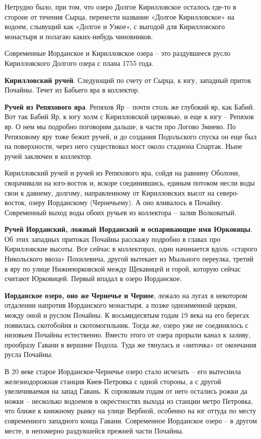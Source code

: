 Нетрудно было, при том, что озеро Долгое Кирилловское осталось где-то в стороне от течения Сырца, перенести название «Долгое Кирилловское» на водоем, слывущий как «Долгое и Узкое», с выгодой для Кирилловского монастыря и полагаю каких-нибудь чиновников.

Современные Иорданское и Кирилловское озера – это раздувшееся русло Кирилловского Долгого озера с плана 1755 года.

\textbf{Кирилловский ручей}. Следующий по счету от Сырца, к югу, западный приток Почайны. Течет из Бабьего яра в коллектор. 

\textbf{Ручей из Репяхового яра}. Репяхов Яр – почти столь же глубокий яр, как Бабий. Вот так Бабий Яр, к югу холм с Кирилловской церковью, и еще к югу – Репяхов яр. О нем мы подробно поговорим дальше, в части про Логово Змиево. По Репяховому яру тоже бежит ручей, и до создания Подольского спуска он еще был на поверхности, через него существовал мост около стадиона Спартак. Ныне ручей заключен в коллектор.

Кирилловский ручей и ручей из Репяхового яра, сойдя на равнину Оболони, сворачивали на юго-восток и, вскоре соединившись, единым потоком несли воды свои к давнему, долгому, направленному от Кирилловских высот на северо-восток, озеру Иорданскому (Чернечьему). А оно вливалось в Почайну. Современный выход воды обоих ручьев из коллектора – залив Волковатый.
 
\textbf{Ручей Иорданский, ложный Иорданский и оспаривающие имя Юрковицы}. Об этих западных притоках Почайны расскажу подробно в главах про Кирилловские высоты. Все сейчас в коллекторах, один начинается вдоль «старого Никольского ввоза» Похилевича, другой вытекает из Мыльного переулка, третий в яру по улице Нижнеюрковской между Щекавицей и горой, которую сейчас считают Юрковицей. Первый впадал в озеро Иорданское.

\textbf{Иорданское озеро, оно же Чернечье и Черное}, лежало на лугах в некотором отдалении напротив Иорданского монастыря, а позже одноименной церкви, между оной и руслом Почайны. К восьмидесятым годам 19 века на его берегах появилась скотобойня и скотомогильник. Тогда же, озеро уже не соединялось с низовьем Почайны естественно. Вместо этого от озера прорыли канал к заливу, прообразу Гавани в вершине Подола. Туда же тянулась и «ниточка» от окончания русла Почайны.

В 20 веке старое Иорданское-Чернечье озеро стало исчезать – его вытеснила железнодорожная станция Киев-Петровка с одной стороны, а с другой увеличиваемая на запад Гавань. К сороковым годам от него остались рожки да ножки – несколько водоемов в окрестностях выхода из станции метро Петровка, что ближе к книжному рынку на улице Вербной, особенно на юг оттуда по месту современного западного конца Гавани. Современное Иорданское озеро – в другом месте, в непомерно раздувшейся прежней части Почайны.

